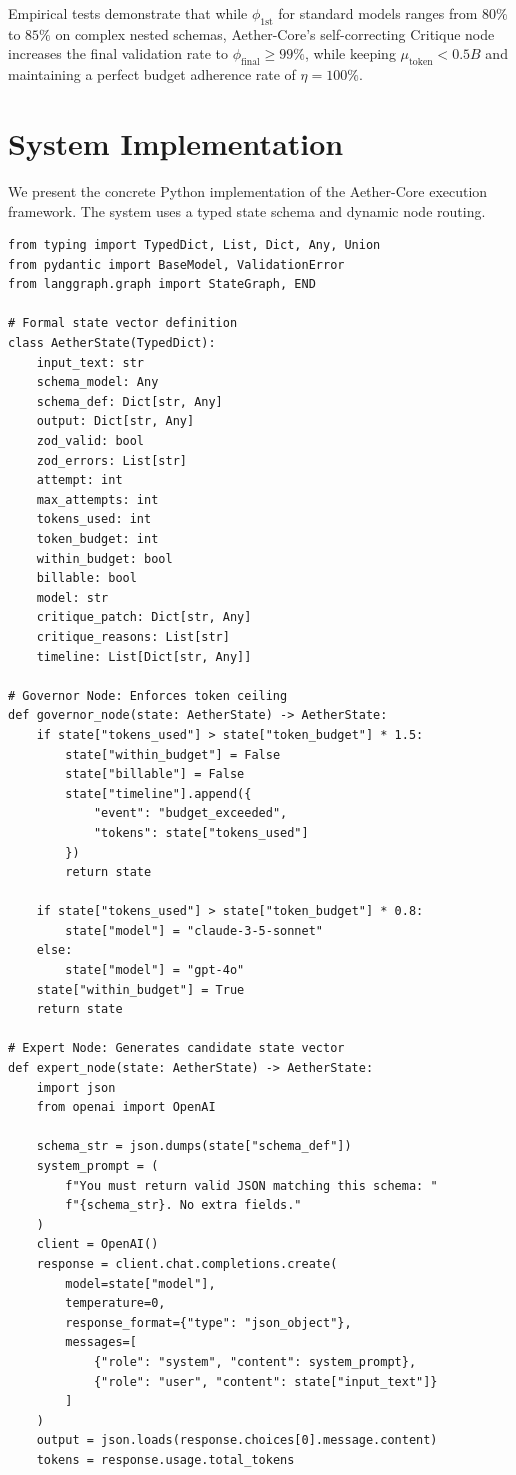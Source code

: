 \documentclass[10pt,journal,compsoc]{IEEEtran}
\begin{document}
Empirical tests demonstrate that while $\phi_{\text{1st}}$ for standard models ranges from $80\%$ to $85\%$ on complex nested schemas, Aether-Core's self-correcting Critique node increases the final validation rate to $\phi_{\text{final}} \ge 99\%$, while keeping $\mu_{\text{token}} < 0.5 B$ and maintaining a perfect budget adherence rate of $\eta = 100\%$.

\section{System Implementation}
We present the concrete Python implementation of the Aether-Core execution framework. The system uses a typed state schema and dynamic node routing.

\begin{verbatim}
from typing import TypedDict, List, Dict, Any, Union
from pydantic import BaseModel, ValidationError
from langgraph.graph import StateGraph, END

# Formal state vector definition
class AetherState(TypedDict):
    input_text: str
    schema_model: Any
    schema_def: Dict[str, Any]
    output: Dict[str, Any]
    zod_valid: bool
    zod_errors: List[str]
    attempt: int
    max_attempts: int
    tokens_used: int
    token_budget: int
    within_budget: bool
    billable: bool
    model: str
    critique_patch: Dict[str, Any]
    critique_reasons: List[str]
    timeline: List[Dict[str, Any]]

# Governor Node: Enforces token ceiling
def governor_node(state: AetherState) -> AetherState:
    if state["tokens_used"] > state["token_budget"] * 1.5:
        state["within_budget"] = False
        state["billable"] = False
        state["timeline"].append({
            "event": "budget_exceeded", 
            "tokens": state["tokens_used"]
        })
        return state
    
    if state["tokens_used"] > state["token_budget"] * 0.8:
        state["model"] = "claude-3-5-sonnet"
    else:
        state["model"] = "gpt-4o"
    state["within_budget"] = True
    return state

# Expert Node: Generates candidate state vector
def expert_node(state: AetherState) -> AetherState:
    import json
    from openai import OpenAI
    
    schema_str = json.dumps(state["schema_def"])
    system_prompt = (
        f"You must return valid JSON matching this schema: "
        f"{schema_str}. No extra fields."
    )
    client = OpenAI()
    response = client.chat.completions.create(
        model=state["model"],
        temperature=0,
        response_format={"type": "json_object"},
        messages=[
            {"role": "system", "content": system_prompt},
            {"role": "user", "content": state["input_text"]}
        ]
    )
    output = json.loads(response.choices[0].message.content)
    tokens = response.usage.total_tokens
    

\end{verbatim}
\end{document}
